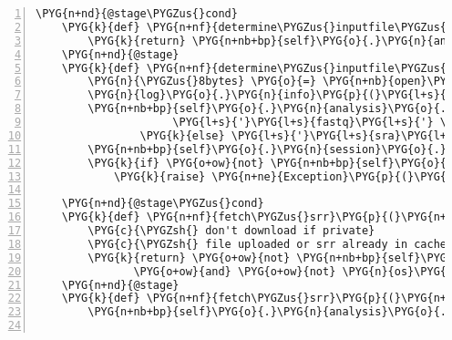 \begin{Verbatim}[commandchars=\\\{\},numbers=left,firstnumber=1,stepnumber=5]
    \PYG{n+nd}{@stage\PYGZus{}cond}
    \PYG{k}{def} \PYG{n+nf}{determine\PYGZus{}inputfile\PYGZus{}type}\PYG{p}{(}\PYG{n+nb+bp}{self}\PYG{p}{)}\PYG{p}{:}
        \PYG{k}{return} \PYG{n+nb+bp}{self}\PYG{o}{.}\PYG{n}{analysis}\PYG{o}{.}\PYG{n}{inputfile\PYGZus{}uploaded}
    \PYG{n+nd}{@stage}
    \PYG{k}{def} \PYG{n+nf}{determine\PYGZus{}inputfile\PYGZus{}type}\PYG{p}{(}\PYG{n+nb+bp}{self}\PYG{p}{)}\PYG{p}{:}
        \PYG{n}{\PYGZus{}8bytes} \PYG{o}{=} \PYG{n+nb}{open}\PYG{p}{(}\PYG{n+nb+bp}{self}\PYG{o}{.}\PYG{n}{analysis}\PYG{o}{.}\PYG{n}{inputfile\PYGZus{}path}\PYG{p}{)}\PYG{o}{.}\PYG{n}{read}\PYG{p}{(}\PYG{l+m+mi}{8}\PYG{p}{)}
        \PYG{n}{log}\PYG{o}{.}\PYG{n}{info}\PYG{p}{(}\PYG{l+s}{"}\PYG{l+s}{first 8 bytes of input data: }\PYG{l+s+si}{\PYGZpc{}r}\PYG{l+s}{"} \PYG{o}{\PYGZpc{}} \PYG{n}{\PYGZus{}8bytes}\PYG{p}{)}
        \PYG{n+nb+bp}{self}\PYG{o}{.}\PYG{n}{analysis}\PYG{o}{.}\PYG{n}{inputfile\PYGZus{}type} \PYG{o}{=} \PYG{p}{(}
                     \PYG{l+s}{'}\PYG{l+s}{fastq}\PYG{l+s}{'} \PYG{k}{if} \PYG{n}{\PYGZus{}8bytes}\PYG{p}{[}\PYG{l+m+mi}{0}\PYG{p}{]} \PYG{o}{==} \PYG{l+s}{'}\PYG{l+s}{@}\PYG{l+s}{'}
                \PYG{k}{else} \PYG{l+s}{'}\PYG{l+s}{sra}\PYG{l+s}{'}   \PYG{k}{if} \PYG{n}{\PYGZus{}8bytes}    \PYG{o}{==} \PYG{l+s}{'}\PYG{l+s}{NCBI.sra}\PYG{l+s}{'} \PYG{k}{else} \PYG{n+nb+bp}{None}\PYG{p}{)}
        \PYG{n+nb+bp}{self}\PYG{o}{.}\PYG{n}{session}\PYG{o}{.}\PYG{n}{commit}\PYG{p}{(}\PYG{p}{)}
        \PYG{k}{if} \PYG{o+ow}{not} \PYG{n+nb+bp}{self}\PYG{o}{.}\PYG{n}{analysis}\PYG{o}{.}\PYG{n}{inputfile\PYGZus{}type}\PYG{p}{:}
            \PYG{k}{raise} \PYG{n+ne}{Exception}\PYG{p}{(}\PYG{l+s}{"}\PYG{l+s}{Unknown input data type}\PYG{l+s}{"}\PYG{p}{)}

    \PYG{n+nd}{@stage\PYGZus{}cond}
    \PYG{k}{def} \PYG{n+nf}{fetch\PYGZus{}srr}\PYG{p}{(}\PYG{n+nb+bp}{self}\PYG{p}{)}\PYG{p}{:}
        \PYG{c}{\PYGZsh{} don't download if private}
        \PYG{c}{\PYGZsh{} file uploaded or srr already in cache}
        \PYG{k}{return} \PYG{o+ow}{not} \PYG{n+nb+bp}{self}\PYG{o}{.}\PYG{n}{analysis}\PYG{o}{.}\PYG{n}{inputfile\PYGZus{}uploaded} \PYGZbs{}
               \PYG{o+ow}{and} \PYG{o+ow}{not} \PYG{n}{os}\PYG{o}{.}\PYG{n}{path}\PYG{o}{.}\PYG{n}{exists}\PYG{p}{(}\PYG{n+nb+bp}{self}\PYG{o}{.}\PYG{n}{analysis}\PYG{o}{.}\PYG{n}{rnaseq\PYGZus{}run}\PYG{o}{.}\PYG{n}{sra\PYGZus{}path}\PYG{p}{)}
    \PYG{n+nd}{@stage}
    \PYG{k}{def} \PYG{n+nf}{fetch\PYGZus{}srr}\PYG{p}{(}\PYG{n+nb+bp}{self}\PYG{p}{)}\PYG{p}{:}
        \PYG{n+nb+bp}{self}\PYG{o}{.}\PYG{n}{analysis}\PYG{o}{.}\PYG{n}{rnaseq\PYGZus{}run}\PYG{o}{.}\PYG{n}{download}\PYG{p}{(}\PYG{p}{)}


\end{Verbatim}

